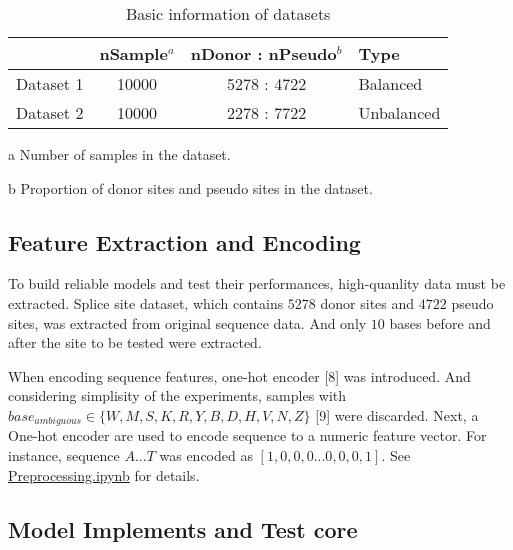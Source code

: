 \documentclass[11pt]{article}
\begin{document}
\begin{table*}[h] %
\centering
\caption{Basic information of datasets} 
\begin{threeparttable}
\begin{tabular}{cccl}
	\toprule
	{} &  nSample$^a$ & nDonor : nPseudo$^b$ &        Type \\
	\midrule
	Dataset 1 &    10000 &      5278 : 4722 &    Balanced \\
	Dataset 2 &    10000 &      2278 : 7722 &  Unbalanced \\
	\bottomrule
\end{tabular}
 \begin{tablenotes}
	\footnotesize
	\item[a] Number of samples in the dataset.
	\item[b] Proportion of donor sites and pseudo sites in the dataset.
\end{tablenotes}
\end{threeparttable}
\end{table*}




    \hypertarget{feature-extraction-and-encoding}{%
\subsection{Feature Extraction and
Encoding}\label{feature-extraction-and-encoding}}

To build reliable models and test their performances, high-quanlity data
must be extracted. Splice site dataset, which contains \(5278\) donor
sites and \(4722\) pseudo sites, was extracted from original sequence
data. And only \(10\) bases before and after the site to be tested were
extracted.

When encoding sequence features, one-hot encoder {[}8{]} was introduced.
And considering simplisity of the experiments, samples with
\(base_{ambiguous} \in \{W,M,S,K,R,Y,B,D,H,V,N,Z\}\) {[}9{]} were
discarded. Next, a One-hot encoder are used to encode sequence to a
numeric feature vector. For instance, sequence \(A...T\) was encoded as
\([1,0,0,0...0,0,0,1]\). See
\href{https://github.com/AdeBC/GSSR/blob/master/Source/Preprocessing.ipynb}{Preprocessing.ipynb}
for details.

    \hypertarget{model-implements-and-test-core}{%
\subsection{Model Implements and Test
core}\label{model-implements-and-test-core}}
\end{document}
